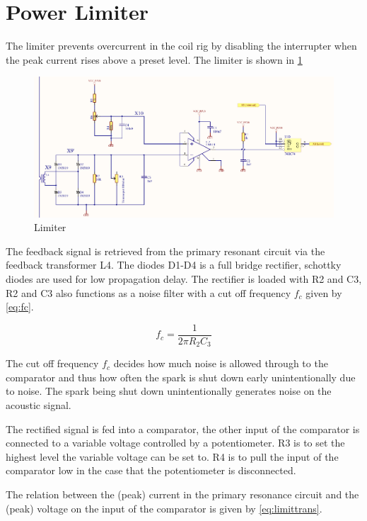 \newpage
\section{Power Limiter}
\label{sec:limiter}

The limiter prevents overcurrent in the coil rig by disabling the interrupter when the peak current rises above a preset level. The limiter is shown in \cref{fig:limiter}

\begin{figure}[H]
    \centering
    \includegraphics[width=\textwidth]{Skjema/TK513_Limiter.pdf}
    \caption{Limiter}
    \label{fig:limiter}
\end{figure}

The feedback signal is retrieved from the primary resonant circuit via the feedback transformer L4. The diodes D1-D4 is a full bridge rectifier, schottky diodes are used for low propagation delay. The rectifier is loaded with R2 and C3, R2 and C3 also functions as a noise filter with a cut off frequency $f_c$ given by \cref{eq:fc}.

\begin{equation} \label{eq:fc}
    f_c = \frac{1}{2 \pi R_2 C_3}
\end{equation}

The cut off frequency $f_c$ decides how much noise is allowed through to the comparator and thus how often the spark is shut down early unintentionally due to noise. The spark being shut down unintentionally generates noise on the acoustic signal.

The rectified signal is fed into a comparator, the other input of the comparator is connected to a variable voltage controlled by a potentiometer. R3 is to set the highest level the variable voltage can be set to. R4 is to pull the input of the comparator low in the case that the potentiometer is disconnected.

The relation between the (peak) current in the primary resonance circuit and the (peak) voltage on the input of the comparator is given by \cref{eq:limittrans}.

